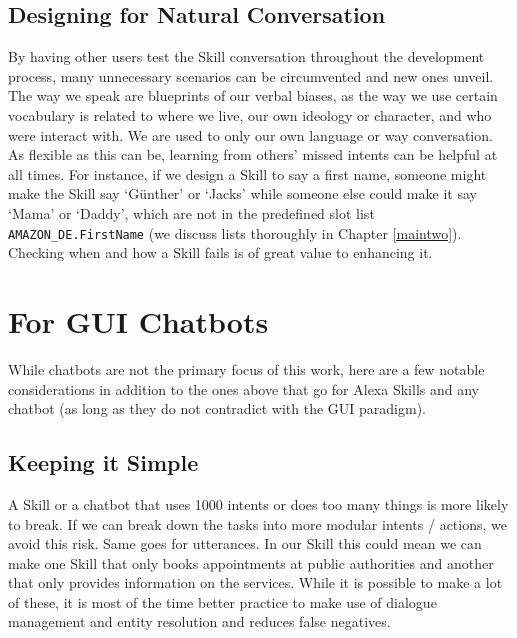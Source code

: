 \subsection*{Designing for Natural Conversation}
By having other users test the Skill conversation throughout the development process, many unnecessary scenarios can be circumvented and new ones unveil. The way we speak are blueprints of our verbal biases, as the way we use certain vocabulary is related to where we live, our own ideology or character, and who were interact with. We are used to only our own language or way conversation. As flexible as this can be, learning from others' missed intents can be helpful at all times. For instance, if we design a Skill to say a first name, someone might make the Skill say `Günther' or `Jacks' while someone else could make it say `Mama' or `Daddy', which are not in the predefined slot list \texttt{AMAZON_DE.FirstName} (we discuss lists thoroughly in Chapter \ref{maintwo}). Checking when and how a Skill fails is of great value to enhancing it.









\section{For GUI Chatbots}


While chatbots are not the primary focus of this work, here are a few notable considerations in addition to the ones above that go for Alexa Skills and any chatbot (as long as they do not contradict with the GUI paradigm).



\subsection*{Keeping it Simple}

A Skill or a chatbot that uses 1000 intents or does too many things is more likely to break. If we can break down the tasks into more modular intents / actions, we avoid this risk. Same goes for utterances. In our Skill this could mean we can make one Skill that only books appointments at public authorities and another that only provides information on the services. While it is possible to make a lot of these, it is most of the time better practice to make use of dialogue management and entity resolution and reduces false negatives.



